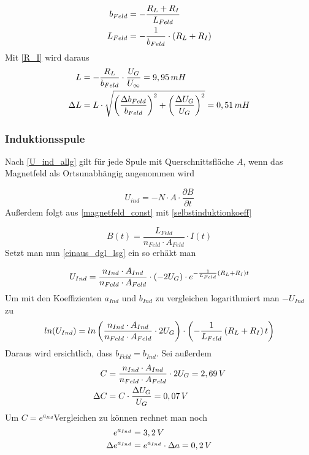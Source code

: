 \documentclass{article}
\begin{document}
\begin{align}
b_{Feld} &= - \frac{R_L + R_I}{L_{Feld}}
\notag
\\
L_{Feld} &= - \frac{1}{b_{Feld}} \cdot \left( R_L + R_I \right)
\notag
\end{align}
Mit \eqref{R_I} wird daraus 
\begin{align}
L &= - \frac{R_L}{b_{Feld}} \cdot \frac{U_G}{U_\infty} = 9,95 \, mH
\notag
\\
\Delta L &= 
L \cdot \sqrt{\left( \frac{\Delta b_{Feld}}{b_{Feld}} \right)^2 + \left( \frac{\Delta U_G}{U_G} \right)^2}
= 0,51 \, mH
\notag
\end{align}

\subsubsection{Induktionsspule}

Nach \eqref{U_ind_allg} gilt für jede Spule mit Querschnittsfläche \(A\), wenn das Magnetfeld als Ortsunabhängig angenommen wird

\begin{equation}
U_{ind} = -N \cdot A \cdot \frac{\partial B}{\partial t}
\label{U_induktionsspule}
\end{equation}
Außerdem folgt aus \eqref{magnetfeld_const} mit \eqref{selbstinduktionkoeff} 

\begin{equation}
B(t) = \frac{L_{Feld}}{n_{Feld} \cdot A_{Feld}} \cdot I(t)
\label{B_induktionsspule}
\end{equation}
Setzt man nun \eqref{einaus_dgl_lsg} ein so erhäkt man

\begin{equation}
U_{Ind} = \frac{n_{Ind} \cdot A_{Ind}}{n_{Feld} \cdot A_{Feld}}  \cdot \left(-2U_G \right) \cdot 
e^{-\frac{1}{L_{Feld}} \left( R_L + R_I \right)t}
\notag
\end{equation}
Um mit den Koeffizienten \(a_{Ind}\) und \(b_{Ind}\) zu vergleichen logarithmiert man \(-U_{Ind} \) zu
\begin{equation}
ln(U_{Ind}) = ln \left( \frac{n_{Ind} \cdot A_{Ind}}{n_{Feld} \cdot A_{Feld}}  \cdot 2U_G \right) \cdot \left( -\frac{1}{L_{Feld}} \left( R_L + R_I \right)t \right)
\notag
\end{equation}
Daraus wird ersichtlich, dass \(b_{Feld} = b_{Ind}\). Sei außerdem
\begin{align}
C &=  \frac{n_{Ind} \cdot A_{Ind}}{n_{Feld} \cdot A_{Feld}}  \cdot 2U_G = 2,69 \, V
\notag
\\
\Delta C &= C \cdot \frac{\Delta U_G}{U_G} = 0,07 \, V
\notag
\end{align}
Um \(C = e^{a_{Ind}} \)Vergleichen zu können rechnet man noch
\begin{align}
e^{a_{Ind}} &= 3,2 \, V
\notag
\\
\Delta e^{a_{Ind}} &= e^{a_{Ind}} \cdot \Delta a = 0,2 \, V
\notag
\end{align}
\end{document}
